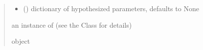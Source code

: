 \documentclass[letterpaper,10pt,english]{sphinxmanual}
\begin{document}
\begin{fulllineitems}
\begin{quote}
\begin{description}
\begin{itemize}
\item {} 
\sphinxAtStartPar
{} (\sphinxstyleliteralemphasis{\sphinxupquote{, }}) \textendash{} dictionary of hypothesized parameters, defaults to None

\end{itemize}

\sphinxAtStartPar
an instance of  (see the Class for details)

\sphinxAtStartPar
object

\end{description}\end{quote}

\end{fulllineitems}

\end{document}
